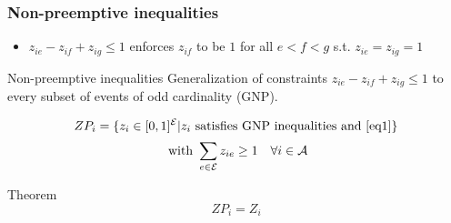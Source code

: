 \documentclass{beamer}
\begin{document}
\begin{frame}
  \frametitle{Non-preemptive inequalities}

  \begin{itemize}
  \item $ z_{ie}-z_{if}+z_{ig} \le 1$ enforces
    $z_{if}$ to be $1$ for all $e<f<g$ s.t. $z_{ie}=z_{ig}=1$ 
  \end{itemize}
  \pause
  \vspace{0.4cm}
  \begin{block}{Non-preemptive inequalities }
    Generalization of constraints $ z_{ie}-z_{if}+z_{ig} \le 1$ to
    every subset of events of odd cardinality (GNP).
  \end{block}
  \pause
  \vspace{0.4cm}
  \[ZP_i=\{ z_i \in [0,1]^{\cal E} | z_i\text{ satisfies
      GNP inequalities and } \eqref{eq1}\}\] 
  \begin{equation}
    \text{ with }  \sum_{e \in \cal E} z_{ie} \ge 1 \quad \forall i \in \cal A  
    \label{eq1}  
  \end{equation}
  \pause
  \vspace{0.4cm}
  \begin{block}{Theorem}
    \[ZP_i=Z_i\]
  \end{block}
  \vspace{0.5cm}
\end{frame}

\addtocounter{framenumber}{-1}
\end{document}
